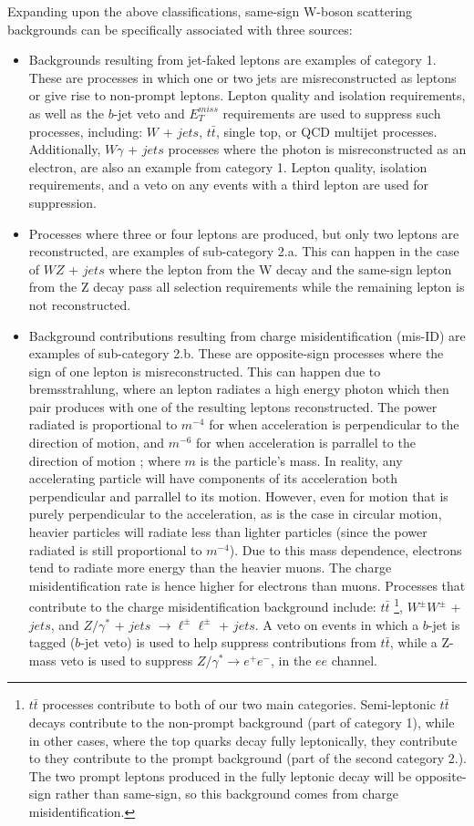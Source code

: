 Expanding upon the above classifications, same-sign W-boson scattering backgrounds can be specifically associated with three sources:
\begin{itemize}
\item Backgrounds resulting from jet-faked leptons are examples of category 1. These are processes in which one or two jets are misreconstructed as leptons or give rise to non-prompt leptons. Lepton quality and isolation requirements, as well as the $b$-jet veto and $E_{T}^{miss}$ requirements are used to suppress such processes, including: $W$ + $jets$, $t\bar{t}$, single top, or QCD multijet processes. Additionally, $W\gamma$ + $jets$ processes where the photon is misreconstructed as an electron, are also an example from category 1. Lepton quality, isolation requirements, and a veto on any events with a third lepton are used for suppression.
\item Processes where three or four leptons are produced, but only two leptons are reconstructed, are examples of sub-category 2.a. This can happen in the case of $WZ$ + $jets$ where the lepton from the W decay and the same-sign lepton from the Z decay pass all selection requirements while the remaining lepton is not reconstructed.
\item Background contributions resulting from charge misidentification (mis-ID) are examples of sub-category 2.b. These are opposite-sign processes where the sign of one lepton is misreconstructed. This can happen due to bremsstrahlung, where an lepton radiates a high energy photon which then pair produces with one of the resulting leptons reconstructed. The power radiated is proportional to $m^{-4}$ for when acceleration is perpendicular to the direction of motion, and $m^{-6}$ for when acceleration is parrallel to the direction of motion \cite{brem}; where $m$ is the particle's mass. In reality, any accelerating particle will have components of its acceleration both perpendicular and parrallel to its motion. However, even for motion that is purely perpendicular to the acceleration, as is the case in circular motion, heavier particles will radiate less than lighter particles (since the power radiated is still proportional to $m^{-4}$). Due to this mass dependence, electrons tend to radiate more energy than the heavier muons. The charge misidentification rate is hence higher for electrons than muons. Processes that contribute to the charge misidentification background include: $t\bar{t}$ \footnote{$t\bar{t}$ processes contribute to both of our two main categories. Semi-leptonic $t\bar{t}$ decays contribute to the non-prompt background (part of category 1), while in other cases, where the top quarks decay fully leptonically, they contribute to they contribute to the prompt background (part of the second category 2.). The two prompt leptons produced in the fully leptonic decay will be opposite-sign rather than same-sign, so this background comes from charge misidentification.}, $W^{\pm}W^{\pm}$ + $jets$, and $Z/\gamma^{*}$ + $jets$ $\longrightarrow \ell^{\pm}\ell^{\pm}$ + $jets$. A veto on events in which a $b$-jet is tagged ($b$-jet veto) is used to help suppress contributions from $t\bar{t}$, while a Z-mass veto is used to suppress $Z/\gamma^{*} \longrightarrow e^{+}e^{-}$, in the $ee$ channel.
\end{itemize}
